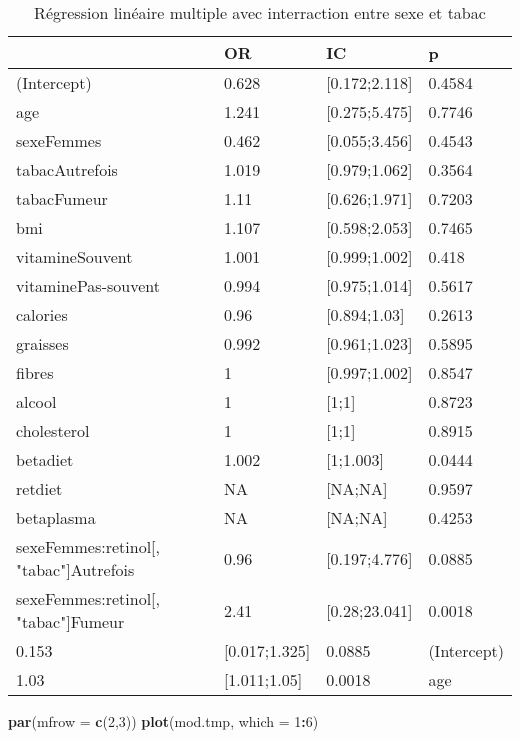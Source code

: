 \documentclass[]{article}
\newenvironment{Shaded}{\begin{snugshade}}{\end{snugshade}}
\newcommand{\KeywordTok}[1]{\textcolor[rgb]{0.13,0.29,0.53}{\textbf{#1}}}
\newcommand{\DataTypeTok}[1]{\textcolor[rgb]{0.13,0.29,0.53}{#1}}
\newcommand{\DecValTok}[1]{\textcolor[rgb]{0.00,0.00,0.81}{#1}}
\newcommand{\OperatorTok}[1]{\textcolor[rgb]{0.81,0.36,0.00}{\textbf{#1}}}
\newcommand{\NormalTok}[1]{#1}
\begin{document}
\begin{table}

\caption{\label{tab:unnamed-chunk-84}Régression linéaire multiple avec interraction entre sexe et tabac}
\centering
\begin{tabular}[t]{l|l|l|l}
\hline
  & OR & IC & p\\
\hline
\rowcolor[HTML]{BBD2E1}  (Intercept) & 0.628 & [0.172;2.118] & 0.4584\\
\hline
age & 1.241 & [0.275;5.475] & 0.7746\\
\hline
\rowcolor[HTML]{BBD2E1}  sexeFemmes & 0.462 & [0.055;3.456] & 0.4543\\
\hline
tabacAutrefois & 1.019 & [0.979;1.062] & 0.3564\\
\hline
\rowcolor[HTML]{BBD2E1}  tabacFumeur & 1.11 & [0.626;1.971] & 0.7203\\
\hline
bmi & 1.107 & [0.598;2.053] & 0.7465\\
\hline
\rowcolor[HTML]{BBD2E1}  vitamineSouvent & 1.001 & [0.999;1.002] & 0.418\\
\hline
vitaminePas-souvent & 0.994 & [0.975;1.014] & 0.5617\\
\hline
\rowcolor[HTML]{BBD2E1}  calories & 0.96 & [0.894;1.03] & 0.2613\\
\hline
graisses & 0.992 & [0.961;1.023] & 0.5895\\
\hline
\rowcolor[HTML]{BBD2E1}  fibres & 1 & [0.997;1.002] & 0.8547\\
\hline
alcool & 1 & [1;1] & 0.8723\\
\hline
\rowcolor[HTML]{BBD2E1}  cholesterol & 1 & [1;1] & 0.8915\\
\hline
betadiet & 1.002 & [1;1.003] & 0.0444\\
\hline
\rowcolor[HTML]{BBD2E1}  retdiet & NA & [NA;NA] & 0.9597\\
\hline
betaplasma & NA & [NA;NA] & 0.4253\\
\hline
\rowcolor[HTML]{BBD2E1}  sexeFemmes:retinol[, "tabac"]Autrefois & 0.96 & [0.197;4.776] & 0.0885\\
\hline
sexeFemmes:retinol[, "tabac"]Fumeur & 2.41 & [0.28;23.041] & 0.0018\\
\hline
\rowcolor[HTML]{BBD2E1}  0.153 & [0.017;1.325] & 0.0885 & (Intercept)\\
\hline
1.03 & [1.011;1.05] & 0.0018 & age\\
\hline
\end{tabular}
\end{table}

\begin{Shaded}
\begin{Highlighting}[]
\KeywordTok{par}\NormalTok{(}\DataTypeTok{mfrow =} \KeywordTok{c}\NormalTok{(}\DecValTok{2}\NormalTok{,}\DecValTok{3}\NormalTok{))}
\KeywordTok{plot}\NormalTok{(mod.tmp, }\DataTypeTok{which =} \DecValTok{1}\OperatorTok{:}\DecValTok{6}\NormalTok{)}
\end{Highlighting}
\end{Shaded}
\end{document}
